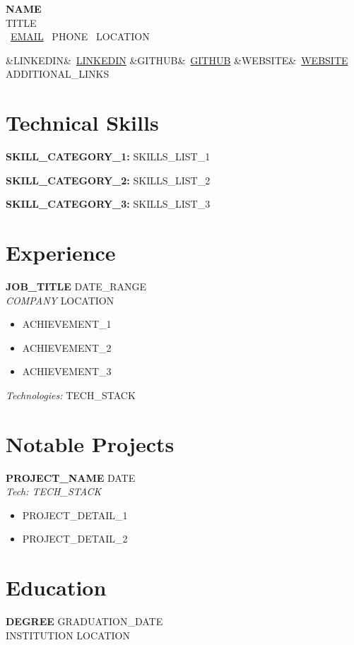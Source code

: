 \documentclass[10pt,a4paper]{article}
\newcommand{\cvheader}[5]{
    \begin{center}
        {\LARGE\bfseries\color{codegray} #1} \\[3pt]
        {\normalsize\color{techblue} #2} \\[6pt]
        {\small
        \faEnvelope\ \href{mailto:#3}{#3} \quad
        \faPhone\ #4 \quad
        \faMapMarker\ #5}
    \end{center}
    \vspace{3pt}
}
\newcommand{\cvlinks}[4]{
    \begin{center}
        {\small
        \ifx&#1&\else\faLinkedin\ \href{#1}{#1} \quad\fi
        \ifx&#2&\else\faGithub\ \href{#2}{#2} \quad\fi
        \ifx&#3&\else\faGlobe\ \href{#3}{#3} \quad\fi
        #4}
    \end{center}
    \vspace{3pt}
}
\newcommand{\cventry}[5]{
    \textbf{#1} \hfill {\small\color{codegray} #2} \\
    {\color{techblue}\textit{#3}} \hfill {\small\color{codegray} #4} \\
    #5
    \vspace{6pt}
}
\newcommand{\cvproject}[4]{
    \textbf{#1} \hfill {\small\color{codegray} #2} \\
    {\small\textit{Tech: #3}} \\
    #4
    \vspace{4pt}
}
\newcommand{\skillgroup}[2]{
    \textbf{#1:} #2
    \vspace{2pt}
}
\begin{document}
\cvheader
    {{NAME}}
    {{TITLE}}
    {{EMAIL}}
    {{PHONE}}
    {{LOCATION}}

\cvlinks
    {{LINKEDIN}}
    {{GITHUB}}
    {{WEBSITE}}
    {{ADDITIONAL_LINKS}}

\section*{Technical Skills}

\skillgroup{{{SKILL_CATEGORY_1}}}{{{SKILLS_LIST_1}}}

\skillgroup{{{SKILL_CATEGORY_2}}}{{{SKILLS_LIST_2}}}

\skillgroup{{{SKILL_CATEGORY_3}}}{{{SKILLS_LIST_3}}}

\section*{Experience}

\cventry
    {{JOB_TITLE}}
    {{DATE_RANGE}}
    {{COMPANY}}
    {{LOCATION}}
    {
    \begin{itemize}[leftmargin=*, itemsep=1pt, parsep=0pt, topsep=2pt]
        \item {{ACHIEVEMENT_1}}
        \item {{ACHIEVEMENT_2}}
        \item {{ACHIEVEMENT_3}}
    \end{itemize}
    \textit{Technologies:} {{TECH_STACK}}
    }


\section*{Notable Projects}

\cvproject
    {{PROJECT_NAME}}
    {{DATE}}
    {{TECH_STACK}}
    {
    \begin{itemize}[leftmargin=*, itemsep=1pt, parsep=0pt, topsep=2pt]
        \item {{PROJECT_DETAIL_1}}
        \item {{PROJECT_DETAIL_2}}
    \end{itemize}
    }

\section*{Education}

\noindent
\textbf{{{DEGREE}}} \hfill {\small\color{codegray} {{GRADUATION_DATE}}} \\
{{INSTITUTION}} \hfill {\small\color{codegray} {{LOCATION}}}

\end{document}

